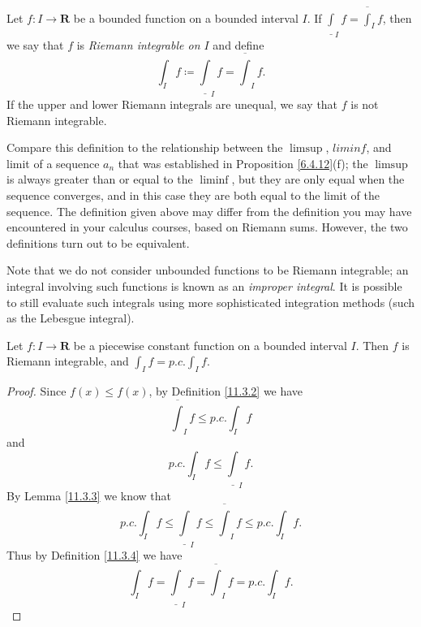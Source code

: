 \begin{definition}\label{11.3.4}
    Let \(f : I \to \mathbf{R}\) be a bounded function on a bounded interval \(I\).
    If \(\underline{\int}_I f = \overline{\int}_I f\), then we say that \(f\) is \emph{Riemann integrable on \(I\)} and define
    \[
        \int_I f \coloneqq \underline{\int}_I f = \overline{\int}_I f.
    \]
    If the upper and lower Riemann integrals are unequal, we say that \(f\) is not Riemann integrable.
\end{definition}

\begin{remark}\label{11.3.5}
    Compare this definition to the relationship between the \(\limsup\), \(liminf\), and limit of a sequence \(a_n\) that was established in Proposition \ref{6.4.12}(f);
    the \(\limsup\) is always greater than or equal to the \(\liminf\), but they are only equal when the sequence converges, and in this case they are both equal to the limit of the sequence.
    The definition given above may differ from the definition you may have encountered in your calculus courses, based on Riemann sums.
    However, the two definitions turn out to be equivalent.
\end{remark}

\begin{remark}\label{11.3.6}
    Note that we do not consider unbounded functions to be Riemann integrable;
    an integral involving such functions is known as an \emph{improper integral}.
    It is possible to still evaluate such integrals using more sophisticated integration methods (such as the Lebesgue integral).
\end{remark}

\begin{lemma}\label{11.3.7}
    Let \(f : I \to \mathbf{R}\) be a piecewise constant function on a bounded interval \(I\).
    Then \(f\) is Riemann integrable, and \(\int_I f = p.c. \int_I f\).
\end{lemma}

\begin{proof}
    Since \(f(x) \leq f(x)\), by Definition \ref{11.3.2} we have
    \[
        \overline{\int}_I f \leq p.c. \int_I f
    \]
    and
    \[
        p.c. \int_I f \leq \underline{\int}_I f.
    \]
    By Lemma \ref{11.3.3} we know that
    \[
        p.c. \int_I f \leq \underline{\int}_I f \leq \overline{\int}_I f \leq p.c. \int_I f.
    \]
    Thus by Definition \ref{11.3.4} we have
    \[
        \int_I f = \underline{\int}_I f = \overline{\int}_I f = p.c. \int_I f.
    \]
\end{proof}

